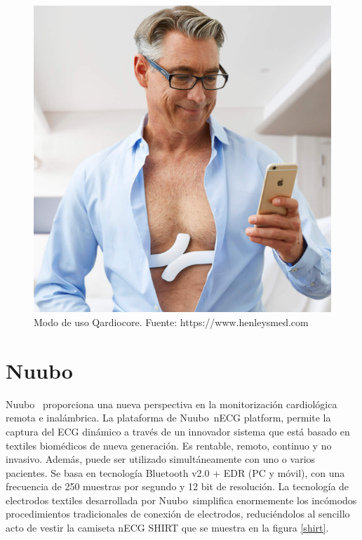 \begin{figure}[H]
	\centering
	\includegraphics[scale=0.5]{figuras/estadoarte/qardio/wear.png}
	\caption{Modo de uso Qardiocore\textregistered. Fuente: https://www.henleysmed.com}
	\label{qardio2}
\end{figure}

\section{Nuubo\textregistered}

Nuubo\textregistered\ \cite{nuubo} proporciona una nueva perspectiva en la monitorización cardiológica remota e inalámbrica. La plataforma de Nuubo\textregistered\, nECG platform, permite la captura del ECG dinámico a través de un innovador sistema que está basado en textiles biomédicos de nueva generación. Es rentable, remoto, continuo y no invasivo. Además, puede ser utilizado simultáneamente con uno o varios pacientes. Se basa en tecnología Bluetooth v2.0 + EDR (PC y móvil), con una frecuencia de 250 muestras por segundo y 12 bit de resolución\cite{nuubo_tel}.
La tecnología de electrodos textiles desarrollada por Nuubo\textregistered\ simplifica enormemente los incómodos procedimientos tradicionales de conexión de electrodos, reduciéndolos al sencillo acto de vestir la camiseta nECG SHIRT que se muestra en la figura \ref{shirt}.

